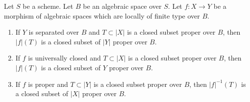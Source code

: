 \begin{lemma}
\label{lemma-functoriality-closed-proper-over-base}
Let $S$ be a scheme. Let $B$ be an algebraic space over $S$.
Let $f : X \to Y$ be a morphism of algebraic spaces which
are locally of finite type over $B$.
\begin{enumerate}
\item If $Y$ is separated over $B$ and $T \subset |X|$ is a closed subset
proper over $B$, then $|f|(T)$ is a closed subset of $|Y|$ proper over $B$.
\item If $f$ is universally closed and $T \subset |X|$ is a
closed subset proper over $B$, then $|f|(T)$ is a closed subset
of $Y$ proper over $B$.
\item If $f$ is proper and $T \subset |Y|$ is a closed subset
proper over $B$, then $|f|^{-1}(T)$ is a closed subset of $|X|$
proper over $B$.
\end{enumerate}
\end{lemma}

